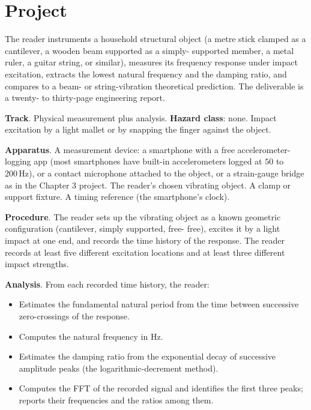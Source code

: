 \section{Project}

\begin{project}
The reader instruments a household structural object (a metre stick
clamped as a cantilever, a wooden beam supported as a simply-
supported member, a metal ruler, a guitar string, or similar),
measures its frequency response under impact excitation, extracts
the lowest natural frequency and the damping ratio, and compares
to a beam- or string-vibration theoretical prediction. The
deliverable is a twenty- to thirty-page engineering report.

\textbf{Track}. Physical measurement plus analysis. \textbf{Hazard
class}: none. Impact excitation by a light mallet or by snapping the
finger against the object.

\textbf{Apparatus}. A measurement device: a smartphone with a free
accelerometer-logging app (most smartphones have built-in
accelerometers logged at $50$ to $200\,\si{\hertz}$), or a contact
microphone attached to the object, or a strain-gauge bridge as in
the Chapter 3 project. The reader's chosen vibrating object. A
clamp or support fixture. A timing reference (the smartphone's
clock).

\textbf{Procedure}. The reader sets up the vibrating object as a
known geometric configuration (cantilever, simply supported, free-
free), excites it by a light impact at one end, and records the
time history of the response. The reader records at least five
different excitation locations and at least three different impact
strengths.

\textbf{Analysis}. From each recorded time history, the reader:

\begin{itemize}[leftmargin=*]
  \item Estimates the fundamental natural period from the time
    between successive zero-crossings of the response.
  \item Computes the natural frequency in Hz.
  \item Estimates the damping ratio from the exponential decay of
    successive amplitude peaks (the logarithmic-decrement method).
  \item Computes the FFT of the recorded signal and identifies the
    first three peaks; reports their frequencies and the ratios
    among them.
\end{itemize}


\end{project}
